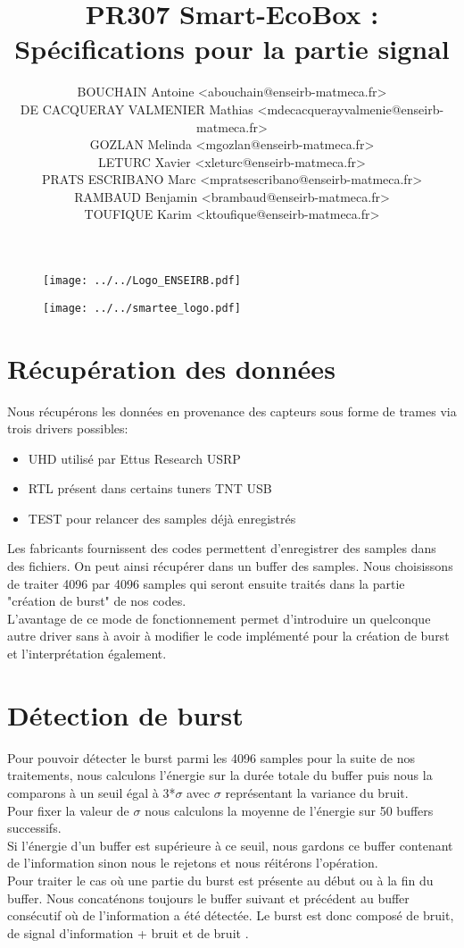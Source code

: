 \documentclass[10pt,a4paper]{article}
\title{PR307 Smart-EcoBox : \\
Spécifications pour la partie signal}
\author{
BOUCHAIN Antoine <abouchain@enseirb-matmeca.fr> \\
DE CACQUERAY VALMENIER Mathias <mdecacquerayvalmenie@enseirb-matmeca.fr> \\
GOZLAN Melinda <mgozlan@enseirb-matmeca.fr>\\
LETURC Xavier <xleturc@enseirb-matmeca.fr> \\
PRATS ESCRIBANO Marc <mpratsescribano@enseirb-matmeca.fr> \\
RAMBAUD Benjamin <brambaud@enseirb-matmeca.fr> \\
TOUFIQUE Karim <ktoufique@enseirb-matmeca.fr> \\ }
\begin{document}
\maketitle

\begin{figure}[ht]
\begin{center}
\noindent \texttt{[image: ../../Logo\_ENSEIRB.pdf]}
\end{center}
\end{figure}
\begin{figure}[ht]
\begin{center}
\noindent \texttt{[image: ../../smartee\_logo.pdf]}
\end{center}
\end{figure}


\newpage

\tableofcontents

\newpage

\section{Récupération des données}

Nous récupérons les données en provenance des capteurs sous forme de trames via trois drivers possibles:
\begin{itemize}
\item UHD utilisé par Ettus Research USRP 
\item RTL présent dans certains tuners TNT USB
\item TEST  pour relancer des samples déjà enregistrés\\
\end{itemize}

Les fabricants fournissent des codes permettent d'enregistrer des samples dans des fichiers.
On peut ainsi récupérer dans un buffer des samples.
Nous choisissons de traiter 4096 par 4096 samples qui seront ensuite traités dans la partie "création de burst" de nos codes.\\

L'avantage de ce mode de fonctionnement permet d'introduire un quelconque autre driver sans à avoir à modifier le code implémenté pour la création de burst et l'interprétation également.

\section{Détection de burst}

Pour pouvoir détecter le burst parmi les 4096 samples pour la suite de nos traitements, nous calculons l'énergie sur la durée totale du buffer puis nous la comparons à un seuil égal à 3*$\sigma$ avec $\sigma$ représentant la variance du bruit.\\ Pour fixer la valeur de $\sigma$ nous calculons la moyenne de l'énergie sur 50 buffers successifs.\\ 
Si l'énergie d'un buffer est supérieure à ce seuil, nous gardons ce buffer contenant de l'information sinon nous le rejetons et nous réitérons l'opération.\\

Pour traiter le cas où une partie du burst est présente au début ou à la fin du buffer. Nous concaténons toujours le buffer suivant et précédent  au buffer consécutif où de l'information a été détectée.
Le burst est donc composé de bruit, de signal d'information + bruit et de bruit .


 
\end{document}
